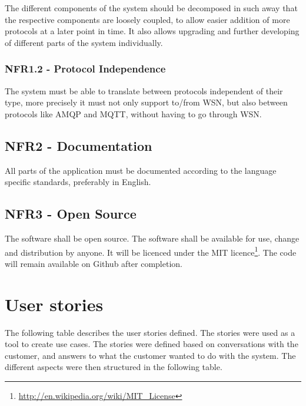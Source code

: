 The different components of the system should be decomposed in such away that the respective components are loosely coupled, to allow easier addition of more protocols at a later point in time. It also allows upgrading and further developing of different parts of the system individually.

\subsubsection{NFR1.2 - Protocol Independence}
\label{subsec:requirements_engineering-non_functional_requirements-protocol_independence}

The system must be able to translate between protocols independent of their type, more precisely it must not only support to/from WSN, but also between protocols like AMQP and MQTT, without having to go through WSN.

\subsection{NFR2 - Documentation}
\label{subsec:requirements_engineering-non_functional_requirements-documentation}

All parts of the application must be documented according to the language specific standards, preferably in English.

\subsection{NFR3 - Open Source}
\label{subsec:requirements_engineering-non_functional_requirements-open_source}

The software shall be open source. The software shall be available for use, change and distribution by anyone. It will be licenced under the MIT licence\footnote{\url{http://en.wikipedia.org/wiki/MIT_License}}. The code will remain available on Github after completion.

\section{User stories}
\label{sec:requirements_engineering-user_stories}

The following table describes the user stories defined. The stories were used as a tool to create use cases. The stories were defined based on conversations with the customer, and answers to what the customer wanted to do with the system. The different aspects were then structured in the following table. 

